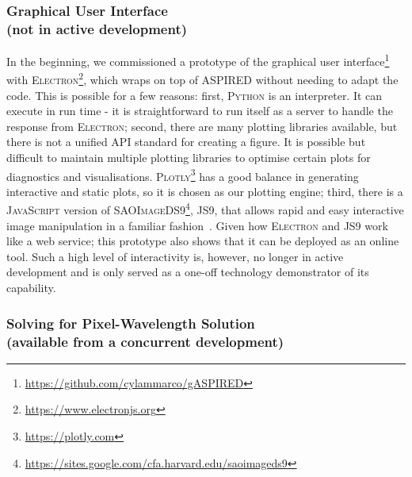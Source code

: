 \documentclass[linenumbers, twocolumn]{aastex631}
\begin{document}
\subsubsection*{Graphical User Interface\\(not in active development)}
In the beginning, we commissioned a prototype of the graphical user
interface\footnote{\url{https://github.com/cylammarco/gASPIRED}} with
\textsc{Electron}\footnote{\url{https://www.electronjs.org}}, which wraps on
top of \textsc{ASPIRED} without needing to adapt the code. This is
possible for a few reasons: first, \textsc{Python} is an interpreter. It can
execute in run time - it is straightforward to run itself as a server to handle
the response from \textsc{Electron}; second, there are many plotting libraries
available, but there is not a unified API standard for creating a figure. It
is possible but difficult to maintain multiple plotting libraries to optimise
certain plots for diagnostics and visualisations.
\textsc{Plotly}\footnote{\url{https://plotly.com}} has a good balance in
generating interactive and static plots, so it is chosen as our plotting engine;
third, there is a \textsc{JavaScript} version of
\textsc{SAOImageDS9}\footnote{\url{https://sites.google.com/cfa.harvard.edu/saoimageds9}}, \textsc{JS9},
that allows rapid and easy interactive image manipulation in a familiar
fashion~\citep{2003ASPC..295..489J, eric_mandel_2022_6675771}. Given how
\textsc{Electron} and \textsc{JS9} work like a web service; this prototype also
shows that it can be deployed as an online tool. Such a high level of
interactivity is, however, no longer in active development and is only served
as a one-off technology demonstrator of its capability.

\subsubsection*{Solving for Pixel-Wavelength Solution\\(available from a concurrent development)}
\end{document}
